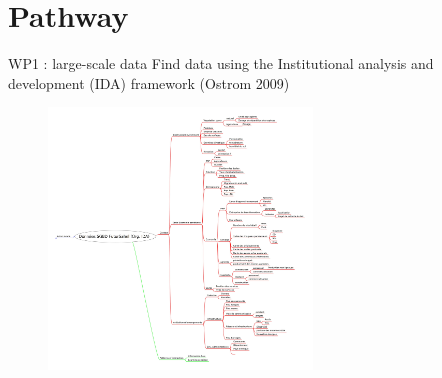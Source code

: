 \documentclass[newPxFont]{beamer}
\begin{document}

\section{Pathway}


\begin{frame}[c]{WP1 : large-scale data}
\vspace{-2em}
Find data using the Institutional analysis and development (IDA) framework (Ostrom 2009)
\vspace{-1em}
\begin{figure}
	\centering
	\includegraphics[width = 7cm]{img/IDA_data_org}
\end{figure}
\end{frame}
\end{document}
